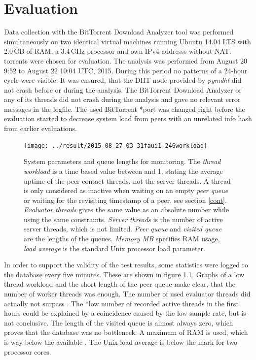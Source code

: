 \documentclass[10pt, a4paper, twoside, headsepline]{scrbook}
\renewcommand{\_}{\origunderscore\allowbreak}
\newcommand{\range}{from August 20 9:52 to August 22 10:04 UTC, 2015} %
\begin{document}
\chapter{Evaluation}
Data collection with the BitTorrent Download Analyzer tool was performed simultaneously on two identical virtual machines running Ubuntu 14.04 LTS with 2.0\,GB of RAM, a 3.4\,GHz processor and own IPv4 addresss without NAT.  torrents were chosen for evaluation. The analysis was performed \range. During this period no patterns of a 24-hour cycle were visible. It was ensured, that the DHT node provided by \emph{pymdht} did not crash before or during the analysis. The BitTorrent Download Analyzer or any of its threads did not crash during the analysis and gave no relevant error messages in the logfile. The used BitTorrent *port was changed right before the evaluation started to decrease system load from peers with an unrelated info hash from earlier evaluations.

\begin{figure}
\centering
\texttt{[image: ../result/2015-08-27\_21-03-31\_faui1-246\_workload]}
\caption[Monitoring parameters during the analysis]{System parameters and queue lengths for monitoring. The \emph{thread workload} is a time based value between  and {1}, stating the average uptime of the peer contact threads, not the server threads. A thread is only considered as inactive when waiting on an empty \emph{peer queue} or waiting for the revisiting timestamp of a peer, see section \ref{cont}. \emph{Evaluator threads} gives the same value as an absolute number while using the same constraints. \emph{Server threads} is the number of active server threads, which is not limited. \emph{Peer queue} and \emph{visited queue} are the lengths of the queues. \emph{Memory MB} specifies RAM usage, \emph{load average} is the standard Unix processor load parameter.}
\label{workload}
\end{figure}

In order to support the validity of the test results, some statistics were logged to the database every five minutes. These are shown in figure \ref{workload}. Graphs of a low thread workload and the short length of the peer queue make clear, that the number of  worker threads was enough. The number of used evaluator threads did actually not surpass . The *low number of recorded active threads in the first hours could be explained by a coincidence caused by the low sample rate, but is not conclusive. The length of the visited queue is almost always zero, which proves that the database was no bottleneck. A maximum of  RAM is used, which is way below the available . The Unix load-average is below the  mark for two processor cores.
\end{document}
